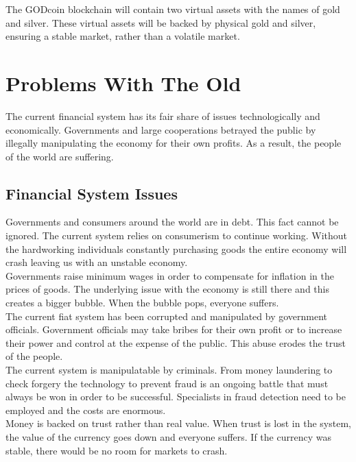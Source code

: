 \documentclass[12pt,a4paper]{article}
\begin{document}
  The GODcoin blockchain will contain two virtual assets with the names of gold
  and silver. These virtual assets will be backed by physical gold and silver,
  ensuring a stable market, rather than a volatile market.

  \section{Problems With The Old}
  The current financial system has its fair share of issues technologically and
  economically. Governments and large cooperations betrayed the public by
  illegally manipulating the economy for their own profits. As a result, the
  people of the world are suffering.

  \subsection{Financial System Issues}
  Governments and consumers around the world are in debt. This fact cannot be
  ignored. The current system relies on consumerism to continue working. Without
  the hardworking individuals constantly purchasing goods the entire economy
  will crash leaving us with an unstable economy.\\

  Governments raise minimum wages in order to compensate for inflation in the
  prices of goods. The underlying issue with the economy is still there and this
  creates a bigger bubble. When the bubble pops, everyone suffers.\\

  The current fiat system has been corrupted and manipulated by government
  officials. Government officials may take bribes for their own profit or to
  increase their power and control at the expense of the public. This abuse
  erodes the trust of the people.\\

  The current system is manipulatable by criminals. From money laundering to
  check forgery the technology to prevent fraud is an ongoing battle that must
  always be won in order to be successful. Specialists in fraud detection need
  to be employed and the costs are enormous.\\

  Money is backed on trust rather than real value. When trust is lost in the
  system, the value of the currency goes down and everyone suffers. If the
  currency was stable, there would be no room for markets to crash.\\
\end{document}
